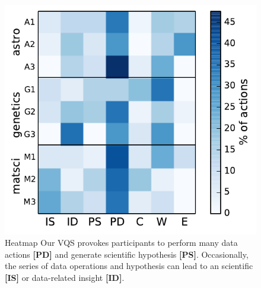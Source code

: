 \begin{figure}[ht!]
    \centering
    \vspace{-10pt}
    \includegraphics[width=0.7\columnwidth]{figures/result1.pdf}
    \vspace{-6pt}\caption{Heatmap  Our VQS provokes participants to perform many data actions \textbf{[PD]} and generate scientific hypothesis \textbf{[PS]}. Occasionally, the series of data operations and hypothesis can lead to an scientific \textbf{[IS]} or data-related insight \textbf{[ID]}.}
    \vspace{-10pt}
    \label{action_heatmap}
\end{figure} 

